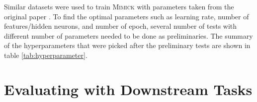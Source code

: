         Similar datasets were used to train \textsc{Mimick} with
        parameters taken from the original paper
        \citep{mimicking2017Pinter}. To find the optimal parameters
        such as learning rate, number of features/hidden neurons, and
        number of epoch, several number of tests with different number
        of parameters needed to be done as preliminaries. The summary
        of the hyperparameters that were picked after the preliminary
        tests are shown in table \ref{tab:hyperparameter}.


    
\section{Evaluating with Downstream Tasks}
